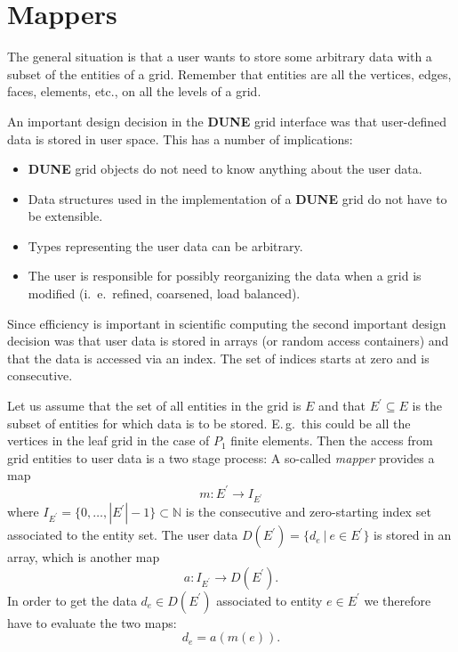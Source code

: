 \documentclass[11pt,a4paper,headinclude,footinclude,DIV16,headings=normal]{scrreprt}
\newcommand{\Dune}{{\sffamily\bfseries DUNE}\xspace}
\begin{document}
\section{Mappers}\label{ch:mappers}

The general situation is that a user wants to store some arbitrary
data with a subset of the entities of a grid. Remember that entities
are all the vertices, edges, faces, elements, etc., on all the levels
of a grid.

An important design decision in the \Dune{} grid interface was that
user-defined data is stored in user space. This has a number of
implications:
\begin{itemize}
\item \Dune{} grid objects do not need to know anything about the user
  data.
\item Data structures used in the implementation of a \Dune{} grid do
  not have to be extensible.
\item Types representing the user data can be arbitrary.
\item The user is responsible for possibly reorganizing the data when
  a grid is modified (i.~e.~refined, coarsened, load balanced).
\end{itemize}

Since efficiency is important in scientific computing the second
important design decision was that user data is stored in arrays (or
random access containers) and that the data is accessed via an
index. The set of indices starts at zero and is consecutive.

Let us assume that the set of all entities in the grid is $E$ and
that $E^\prime\subseteq E$ is the subset of entities for which data is
to be stored. E.\,g.~this could be all the vertices in the leaf grid in
the case of $P_1$ finite elements. Then the access from grid entities
to user data is a two stage process: A so-called \textit{mapper}
provides a map
\begin{equation}
m : E^\prime \to I_{E^\prime}
\end{equation}
where $I_{E^\prime}=\{0,\ldots,|E^\prime|-1\}\subset\mathbb{N}$ is the consecutive and
zero-starting index set associated to the entity set. The user data
$D(E^\prime)=\{d_e\ |\ e\in E^\prime\}$ is stored in an array, which
is another map
\begin{equation}
a : I_{E^\prime} \to D(E^\prime).
\end{equation}
In order to get the data $d_e\in D(E^\prime)$ associated to entity
$e\in E^\prime$ we therefore have to evaluate the two maps:
\begin{equation}
d_e = a(m(e)) .
\end{equation}
\end{document}
